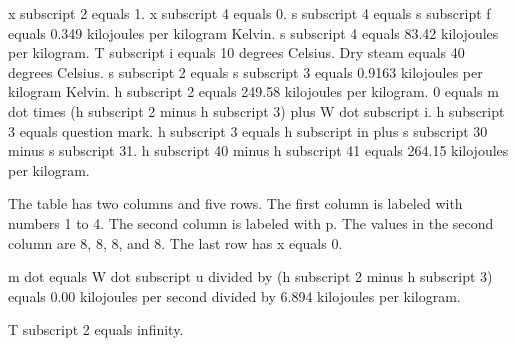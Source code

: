 x subscript 2 equals 1.
x subscript 4 equals 0.
s subscript 4 equals s subscript f equals 0.349 kilojoules per kilogram Kelvin.
s subscript 4 equals 83.42 kilojoules per kilogram.
T subscript i equals 10 degrees Celsius.
Dry steam equals 40 degrees Celsius.
s subscript 2 equals s subscript 3 equals 0.9163 kilojoules per kilogram Kelvin.
h subscript 2 equals 249.58 kilojoules per kilogram.
0 equals m dot times (h subscript 2 minus h subscript 3) plus W dot subscript i.
h subscript 3 equals question mark.
h subscript 3 equals h subscript in plus s subscript 30 minus s subscript 31.
h subscript 40 minus h subscript 41 equals 264.15 kilojoules per kilogram.

The table has two columns and five rows.
The first column is labeled with numbers 1 to 4.
The second column is labeled with p.
The values in the second column are 8, 8, 8, and 8.
The last row has x equals 0.

m dot equals W dot subscript u divided by (h subscript 2 minus h subscript 3) equals 0.00 kilojoules per second divided by 6.894 kilojoules per kilogram.

T subscript 2 equals infinity.